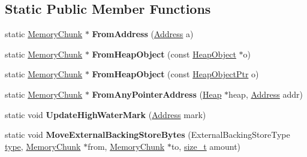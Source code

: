 \subsection*{Static Public Member Functions}
\begin{DoxyCompactItemize}
\item 
\mbox{\label{classv8_1_1internal_1_1MemoryChunk_aa085e1ca88c6b66f52e3f12dc4c89195}} 
static \mbox{\hyperlink{classv8_1_1internal_1_1MemoryChunk}{Memory\+Chunk}} $\ast$ {\bfseries From\+Address} (\mbox{\hyperlink{classuintptr__t}{Address}} a)
\item 
\mbox{\label{classv8_1_1internal_1_1MemoryChunk_a572c743a51b24eb99fbdfd6647890c50}} 
static \mbox{\hyperlink{classv8_1_1internal_1_1MemoryChunk}{Memory\+Chunk}} $\ast$ {\bfseries From\+Heap\+Object} (const \mbox{\hyperlink{classv8_1_1internal_1_1HeapObject}{Heap\+Object}} $\ast$o)
\item 
\mbox{\label{classv8_1_1internal_1_1MemoryChunk_a67f16df2e48ac3e5969f63ecfadad3b8}} 
static \mbox{\hyperlink{classv8_1_1internal_1_1MemoryChunk}{Memory\+Chunk}} $\ast$ {\bfseries From\+Heap\+Object} (const \mbox{\hyperlink{classv8_1_1internal_1_1HeapObjectPtr}{Heap\+Object\+Ptr}} o)
\item 
\mbox{\label{classv8_1_1internal_1_1MemoryChunk_aaeeba00d4bdae95dc0fa7c4200924e69}} 
static \mbox{\hyperlink{classv8_1_1internal_1_1MemoryChunk}{Memory\+Chunk}} $\ast$ {\bfseries From\+Any\+Pointer\+Address} (\mbox{\hyperlink{classv8_1_1internal_1_1Heap}{Heap}} $\ast$heap, \mbox{\hyperlink{classuintptr__t}{Address}} addr)
\item 
\mbox{\label{classv8_1_1internal_1_1MemoryChunk_aa477c12d9fb6017aa4378416ad7802b8}} 
static void {\bfseries Update\+High\+Water\+Mark} (\mbox{\hyperlink{classuintptr__t}{Address}} mark)
\item 
\mbox{\label{classv8_1_1internal_1_1MemoryChunk_ab4f9853febd7f95615b4b6c85c2863ff}} 
static void {\bfseries Move\+External\+Backing\+Store\+Bytes} (External\+Backing\+Store\+Type \mbox{\hyperlink{classstd_1_1conditional_1_1type}{type}}, \mbox{\hyperlink{classv8_1_1internal_1_1MemoryChunk}{Memory\+Chunk}} $\ast$from, \mbox{\hyperlink{classv8_1_1internal_1_1MemoryChunk}{Memory\+Chunk}} $\ast$to, \mbox{\hyperlink{classsize__t}{size\+\_\+t}} amount)
\end{DoxyCompactItemize}
